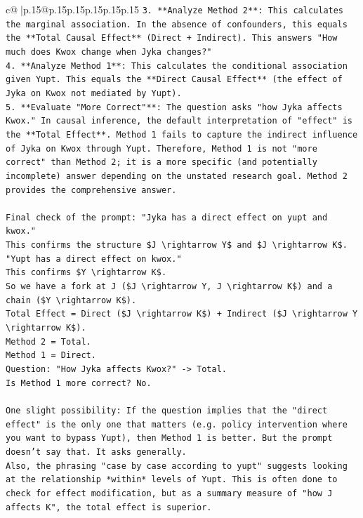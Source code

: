 \documentclass{article}
\begin{document}
{\begin{supertabular}{c@{$\;$}|p{.15\linewidth}@{}p{.15\linewidth}p{.15\linewidth}p{.15\linewidth}p{.15\linewidth}p{.15\linewidth}}
{{{\texttt{3.  **Analyze Method 2**: This calculates the marginal association. In the absence of confounders, this equals the **Total Causal Effect** (Direct + Indirect). This answers "How much does Kwox change when Jyka changes?"} \\
\texttt{4.  **Analyze Method 1**: This calculates the conditional association given Yupt. This equals the **Direct Causal Effect** (the effect of Jyka on Kwox not mediated by Yupt).} \\
\texttt{5.  **Evaluate "More Correct"**: The question asks "how Jyka affects Kwox." In causal inference, the default interpretation of "effect" is the **Total Effect**. Method 1 fails to capture the indirect influence of Jyka on Kwox through Yupt. Therefore, Method 1 is not "more correct" than Method 2; it is a more specific (and potentially incomplete) answer depending on the unstated research goal. Method 2 provides the comprehensive answer.} \\
\\ 
\texttt{Final check of the prompt: "Jyka has a direct effect on yupt and kwox."} \\
\texttt{This confirms the structure \$J \textbackslash{}rightarrow Y\$ and \$J \textbackslash{}rightarrow K\$.} \\
\texttt{"Yupt has a direct effect on kwox."} \\
\texttt{This confirms \$Y \textbackslash{}rightarrow K\$.} \\
\texttt{So we have a fork at J (\$J \textbackslash{}rightarrow Y, J \textbackslash{}rightarrow K\$) and a chain (\$Y \textbackslash{}rightarrow K\$).} \\
\texttt{Total Effect = Direct (\$J \textbackslash{}rightarrow K\$) + Indirect (\$J \textbackslash{}rightarrow Y \textbackslash{}rightarrow K\$).} \\
\texttt{Method 2 = Total.} \\
\texttt{Method 1 = Direct.} \\
\texttt{Question: "How Jyka affects Kwox?" {-}> Total.} \\
\texttt{Is Method 1 more correct? No.} \\
\\ 
\texttt{One slight possibility: If the question implies that the "direct effect" is the only one that matters (e.g. policy intervention where you want to bypass Yupt), then Method 1 is better. But the prompt doesn't say that. It asks generally.} \\
\texttt{Also, the phrasing "case by case according to yupt" suggests looking at the relationship *within* levels of Yupt. This is often done to check for effect modification, but as a summary measure of "how J affects K", the total effect is superior.} \\
}}}
\end{supertabular}}
\end{document}

